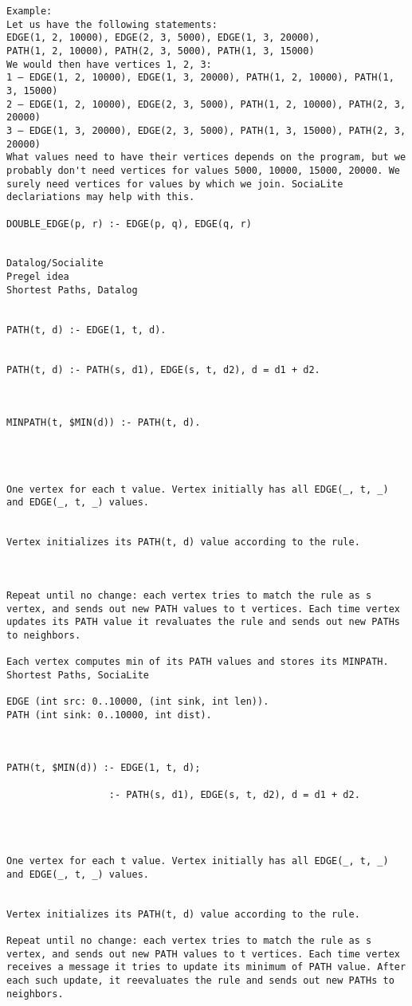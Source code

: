 \begin{verbatim}
Example:
Let us have the following statements:
EDGE(1, 2, 10000), EDGE(2, 3, 5000), EDGE(1, 3, 20000),
PATH(1, 2, 10000), PATH(2, 3, 5000), PATH(1, 3, 15000)
We would then have vertices 1, 2, 3:
1 – EDGE(1, 2, 10000), EDGE(1, 3, 20000), PATH(1, 2, 10000), PATH(1, 3, 15000)
2 – EDGE(1, 2, 10000), EDGE(2, 3, 5000), PATH(1, 2, 10000), PATH(2, 3, 20000)
3 – EDGE(1, 3, 20000), EDGE(2, 3, 5000), PATH(1, 3, 15000), PATH(2, 3, 20000)
What values need to have their vertices depends on the program, but we probably don't need vertices for values 5000, 10000, 15000, 20000. We surely need vertices for values by which we join. SociaLite declariations may help with this.

DOUBLE_EDGE(p, r) :- EDGE(p, q), EDGE(q, r)


Datalog/Socialite
Pregel idea
Shortest Paths, Datalog


PATH(t, d) :- EDGE(1, t, d).


PATH(t, d) :- PATH(s, d1), EDGE(s, t, d2), d = d1 + d2.



MINPATH(t, $MIN(d)) :- PATH(t, d). 




One vertex for each t value. Vertex initially has all EDGE(_, t, _) and EDGE(_, t, _) values.


Vertex initializes its PATH(t, d) value according to the rule.



Repeat until no change: each vertex tries to match the rule as s vertex, and sends out new PATH values to t vertices. Each time vertex updates its PATH value it revaluates the rule and sends out new PATHs to neighbors.

Each vertex computes min of its PATH values and stores its MINPATH.
Shortest Paths, SociaLite

EDGE (int src: 0..10000, (int sink, int len)).
PATH (int sink: 0..10000, int dist).



PATH(t, $MIN(d)) :- EDGE(1, t, d);
                        
                  :- PATH(s, d1), EDGE(s, t, d2), d = d1 + d2. 


	 	 	

One vertex for each t value. Vertex initially has all EDGE(_, t, _) and EDGE(_, t, _) values.


Vertex initializes its PATH(t, d) value according to the rule.

Repeat until no change: each vertex tries to match the rule as s vertex, and sends out new PATH values to t vertices. Each time vertex receives a message it tries to update its minimum of PATH value. After each such update, it reevaluates the rule and sends out new PATHs to neighbors.


\end{verbatim}
